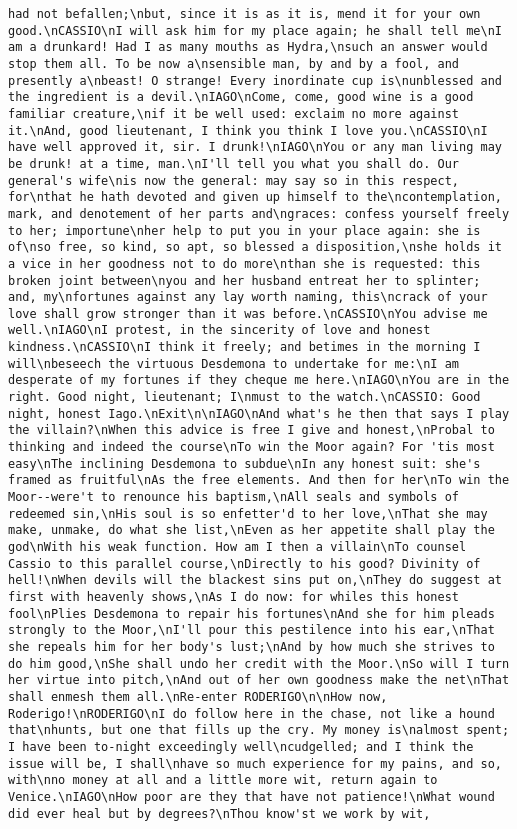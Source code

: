 \begin{verbatim}
had not befallen;\nbut, since it is as it is, mend it for your own good.\nCASSIO\nI will ask him for my place again; he shall tell me\nI am a drunkard! Had I as many mouths as Hydra,\nsuch an answer would stop them all. To be now a\nsensible man, by and by a fool, and presently a\nbeast! O strange! Every inordinate cup is\nunblessed and the ingredient is a devil.\nIAGO\nCome, come, good wine is a good familiar creature,\nif it be well used: exclaim no more against it.\nAnd, good lieutenant, I think you think I love you.\nCASSIO\nI have well approved it, sir. I drunk!\nIAGO\nYou or any man living may be drunk! at a time, man.\nI'll tell you what you shall do. Our general's wife\nis now the general: may say so in this respect, for\nthat he hath devoted and given up himself to the\ncontemplation, mark, and denotement of her parts and\ngraces: confess yourself freely to her; importune\nher help to put you in your place again: she is of\nso free, so kind, so apt, so blessed a disposition,\nshe holds it a vice in her goodness not to do more\nthan she is requested: this broken joint between\nyou and her husband entreat her to splinter; and, my\nfortunes against any lay worth naming, this\ncrack of your love shall grow stronger than it was before.\nCASSIO\nYou advise me well.\nIAGO\nI protest, in the sincerity of love and honest kindness.\nCASSIO\nI think it freely; and betimes in the morning I will\nbeseech the virtuous Desdemona to undertake for me:\nI am desperate of my fortunes if they cheque me here.\nIAGO\nYou are in the right. Good night, lieutenant; I\nmust to the watch.\nCASSIO: Good night, honest Iago.\nExit\n\nIAGO\nAnd what's he then that says I play the villain?\nWhen this advice is free I give and honest,\nProbal to thinking and indeed the course\nTo win the Moor again? For 'tis most easy\nThe inclining Desdemona to subdue\nIn any honest suit: she's framed as fruitful\nAs the free elements. And then for her\nTo win the Moor--were't to renounce his baptism,\nAll seals and symbols of redeemed sin,\nHis soul is so enfetter'd to her love,\nThat she may make, unmake, do what she list,\nEven as her appetite shall play the god\nWith his weak function. How am I then a villain\nTo counsel Cassio to this parallel course,\nDirectly to his good? Divinity of hell!\nWhen devils will the blackest sins put on,\nThey do suggest at first with heavenly shows,\nAs I do now: for whiles this honest fool\nPlies Desdemona to repair his fortunes\nAnd she for him pleads strongly to the Moor,\nI'll pour this pestilence into his ear,\nThat she repeals him for her body's lust;\nAnd by how much she strives to do him good,\nShe shall undo her credit with the Moor.\nSo will I turn her virtue into pitch,\nAnd out of her own goodness make the net\nThat shall enmesh them all.\nRe-enter RODERIGO\n\nHow now, Roderigo!\nRODERIGO\nI do follow here in the chase, not like a hound that\nhunts, but one that fills up the cry. My money is\nalmost spent; I have been to-night exceedingly well\ncudgelled; and I think the issue will be, I shall\nhave so much experience for my pains, and so, with\nno money at all and a little more wit, return again to Venice.\nIAGO\nHow poor are they that have not patience!\nWhat wound did ever heal but by degrees?\nThou know'st we work by wit, 
\end{verbatim}
